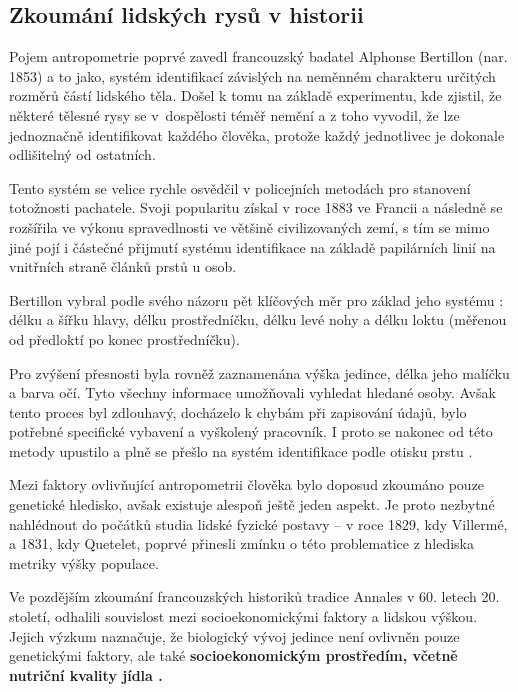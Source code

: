 \subsection*{Zkoumání lidských rysů v historii}
Pojem antropometrie poprvé zavedl francouzský badatel Alphonse Bertillon \cite{Hugh1911} (nar. 1853) a to jako, systém identifikací závislých na neměnném charakteru určitých rozměrů částí lidského těla. Došel k tomu na základě experimentu, kde zjistil, že některé tělesné rysy se v~dospělosti téměř nemění a z toho vyvodil, že lze jednoznačně identifikovat každého člověka, protože každý jednotlivec je dokonale odlišitelný od ostatních. 

Tento systém se velice rychle osvědčil v policejních metodách pro stanovení totožnosti pachatele. Svoji popularitu získal v roce 1883 ve Francii a následně se rozšířila ve výkonu spravedlnosti ve většině civilizovaných zemí, s tím se mimo jiné pojí i částečné přijmutí systému identifikace na základě papilárních linií na vnitřních straně článků prstů u osob. 

Bertillon vybral podle svého názoru pět klíčových měr pro základ jeho systému \cite{Hugh1911}: délku a šířku hlavy, délku prostředníčku, délku levé nohy a délku loktu (měřenou od předloktí po konec prostředníčku).

Pro zvýšení přesnosti byla rovněž zaznamenána výška jedince, délka jeho malíčku a barva očí. Tyto všechny informace umožňovali vyhledat hledané osoby. Avšak tento proces byl zdlouhavý, docházelo k chybám při zapisování údajů, bylo potřebné specifické vybavení a vyškolený pracovník. I proto se nakonec od této metody upustilo a plně se přešlo na systém identifikace podle otisku prstu \cite{Hugh1911}.

\bigskip

\noindent Mezi faktory ovlivňující antropometrii člověka bylo doposud zkoumáno pouze genetické hledisko, avšak existuje alespoň ještě jeden aspekt. Je proto nezbytné nahlédnout do počátků studia lidské fyzické postavy -- v roce 1829, kdy Villermé, a 1831, kdy Quetelet, poprvé přinesli zmínku o této problematice z hlediska metriky výšky populace. 

Ve pozdějším zkoumání francouzských historiků tradice Annales v 60. letech 20. století, odhalili souvislost mezi socioekonomickými faktory a lidskou výškou. Jejich výzkum naznačuje, že biologický vývoj jedince není ovlivněn pouze genetickými faktory, ale také \bf socioekonomickým prostředím\rm, včetně nutriční kvality jídla \cite{Komlos}.


